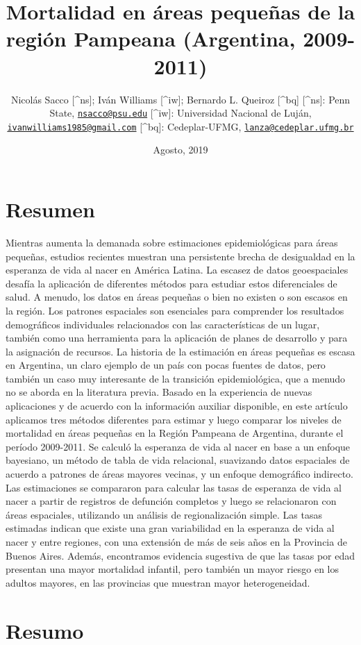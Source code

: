 \documentclass[12pt,]{article}
\title{Mortalidad en áreas pequeñas de la región Pampeana (Argentina,
2009-2011)}
\author{Nicolás Sacco {[}\^{}ns{]}; Iván Williams {[}\^{}iw{]}; Bernardo L.
Queiroz {[}\^{}bq{]} {[}\^{}ns{]}: Penn State,
\href{mailto:nsacco@psu.edu}{\nolinkurl{nsacco@psu.edu}} {[}\^{}iw{]}:
Universidad Nacional de Luján,
\href{mailto:ivanwilliams1985@gmail.com}{\nolinkurl{ivanwilliams1985@gmail.com}}
{[}\^{}bq{]}: Cedeplar-UFMG,
\href{mailto:lanza@cedeplar.ufmg.br}{\nolinkurl{lanza@cedeplar.ufmg.br}}}
\date{Agosto, 2019}
\begin{document}
\maketitle

\hypertarget{resumen}{%
\section{\texorpdfstring{\textbf{Resumen}}{Resumen}}\label{resumen}}

Mientras aumenta la demanada sobre estimaciones epidemiológicas para
áreas pequeñas, estudios recientes muestran una persistente brecha de
desigualdad en la esperanza de vida al nacer en América Latina. La
escasez de datos geoespaciales desafía la aplicación de diferentes
métodos para estudiar estos diferenciales de salud. A menudo, los datos
en áreas pequeñas o bien no existen o son escasos en la región. Los
patrones espaciales son esenciales para comprender los resultados
demográficos individuales relacionados con las características de un
lugar, también como una herramienta para la aplicación de planes de
desarrollo y para la asignación de recursos. La historia de la
estimación en áreas pequeñas es escasa en Argentina, un claro ejemplo de
un país con pocas fuentes de datos, pero también un caso muy interesante
de la transición epidemiológica, que a menudo no se aborda en la
literatura previa. Basado en la experiencia de nuevas aplicaciones y de
acuerdo con la información auxiliar disponible, en este artículo
aplicamos tres métodos diferentes para estimar y luego comparar los
niveles de mortalidad en áreas pequeñas en la Región Pampeana de
Argentina, durante el período 2009-2011. Se calculó la esperanza de vida
al nacer en base a un enfoque bayesiano, un método de tabla de vida
relacional, suavizando datos espaciales de acuerdo a patrones de áreas
mayores vecinas, y un enfoque demográfico indirecto. Las estimaciones se
compararon para calcular las tasas de esperanza de vida al nacer a
partir de registros de defunción completos y luego se relacionaron con
áreas espaciales, utilizando un análisis de regionalización simple. Las
tasas estimadas indican que existe una gran variabilidad en la esperanza
de vida al nacer y entre regiones, con una extensión de más de seis años
en la Provincia de Buenos Aires. Además, encontramos evidencia sugestiva
de que las tasas por edad presentan una mayor mortalidad infantil, pero
también un mayor riesgo en los adultos mayores, en las provincias que
muestran mayor heterogeneidad.

\hypertarget{resumo}{%
\section{\texorpdfstring{\textbf{Resumo}}{Resumo}}\label{resumo}}
\end{document}
